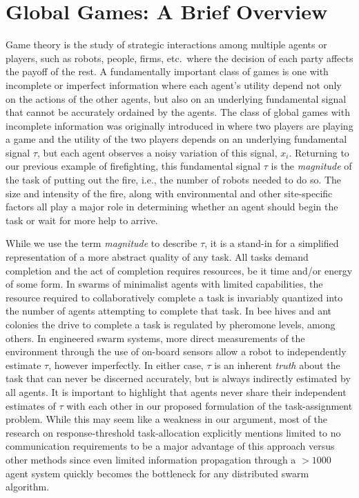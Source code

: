 \documentclass[conference]{ieeeconf}
\begin{document}
\section{Global Games: A Brief Overview}\label{sec:ggoverview}
Game theory is the study of strategic interactions among multiple agents or players, such as robots, people, firms, etc.\ where the decision of each party affects the payoff of the rest. A fundamentally important class of games is one with incomplete or imperfect information where each agent's utility depend not only on the actions of the other agents, but also on an underlying fundamental signal that cannot be accurately ordained by the agents. The class of global games with incomplete information was originally introduced in \cite{Carlsson1993} where two players are playing a game and the utility of the two players depends on an underlying fundamental signal $\tau$, but each agent observes a noisy variation of this signal, $x_i$. Returning to our previous example of firefighting, this fundamental signal $\tau$ is the \emph{magnitude} of the task of putting out the fire, i.e., the number of robots needed to do so. The size and intensity of the fire, along with environmental and other site-specific factors all play a major role in determining whether an agent should begin the task or wait for more help to arrive.

While we use the term \emph{magnitude} to describe $\tau$, it is a stand-in for a simplified representation of a more abstract quality of any task. All tasks demand completion and the act of completion requires resources, be it time and/or energy of some form. In swarms of minimalist agents with limited capabilities, the resource required to collaboratively complete a task is invariably quantized into the number of agents attempting to complete that task.
In bee hives and ant colonies the drive to complete a task is regulated by pheromone levels, among others.  In engineered swarm systems, more direct measurements of the environment through the use of on-board sensors allow a robot to independently estimate $\tau$, however imperfectly. In either case, $\tau$ is an inherent \emph{truth} about the task that can never be discerned accurately, but is always indirectly estimated by all agents. It is important to highlight that agents never share their independent estimates of $\tau$ with each other in our proposed formulation of the task-assignment problem. While this may seem like a weakness in our argument, most of the research on response-threshold task-allocation explicitly mentions limited to no communication requirements to be a major advantage of this approach versus other methods since even limited information propagation through a $>1000$ agent system quickly becomes the bottleneck for any distributed swarm algorithm.
\end{document}
